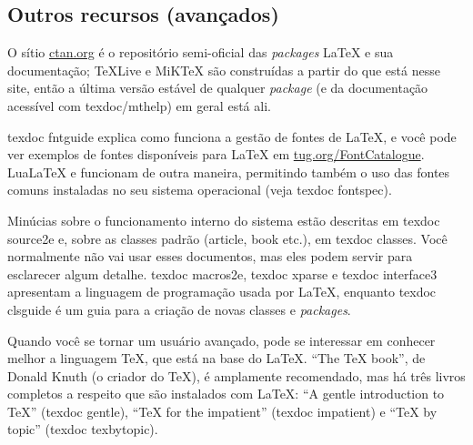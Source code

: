 \subsection{Outros recursos (avançados)}

O sítio \href{http://ctan.org}{ctan.org} é o repositório semi-oficial das
\textit{packages} \LaTeX{} e sua documentação; \TeX{}Live e MiK\TeX{} são
construídas a partir do que está nesse site, então a última versão estável de
qualquer \textit{package} (e da documentação acessível com \textsf{texdoc/mthelp})
em geral está ali.

\textsf{texdoc fntguide} explica como funciona a gestão de fontes de
\LaTeX{}, e você pode ver exemplos de fontes disponíveis para \LaTeX{}
em \href{http://tug.org/FontCatalogue}{tug.org/FontCatalogue}. Lua\LaTeX{}
e \XeLaTeX{} funcionam de outra maneira, permitindo também o uso das fontes
comuns instaladas no seu sistema operacional (veja \textsf{texdoc fontspec}).

Minúcias sobre o funcionamento interno do sistema estão descritas em
\textsf{texdoc source2e} e, sobre as classes padrão (\textsf{article, book}
etc.), em \textsf{texdoc classes}. Você normalmente não vai usar esses
documentos, mas eles podem servir para esclarecer algum detalhe.
\textsf{texdoc macros2e}, \textsf{texdoc xparse} e \textsf{texdoc
interface3} apresentam a linguagem de programação usada por \LaTeX{},
enquanto \textsf{texdoc clsguide} é um guia para a criação de novas
classes e \textit{packages}.

Quando você se tornar um usuário avançado, pode se interessar em conhecer
melhor a linguagem \TeX{}, que está na base do \LaTeX{}. ``The \TeX{} book'',
de Donald Knuth (o criador do \TeX), é amplamente recomendado, mas há três
livros completos a respeito que são instalados com \LaTeX{}: ``A gentle
introduction to \TeX{}'' (\textsf{texdoc gentle}), ``\TeX{} for the
impatient'' (\textsf{texdoc impatient}) e ``\TeX{} by topic'' (\textsf{texdoc
texbytopic}).
